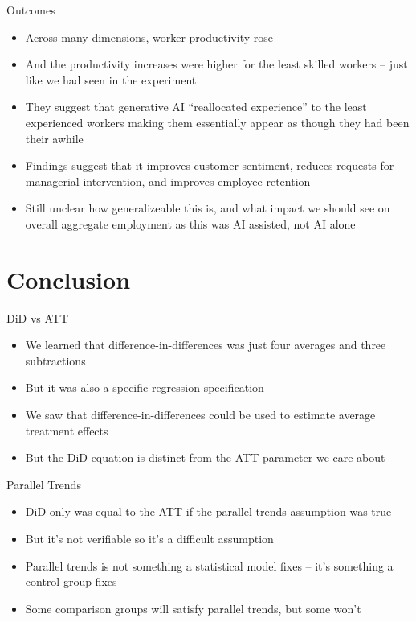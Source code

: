 \documentclass{beamer}
\begin{document}
\begin{frame}{Outcomes}

\begin{itemize}

\item Across many dimensions, worker productivity rose
\item And the productivity increases were higher for the least skilled workers -- just like we had seen in the experiment
\item They suggest that generative AI ``reallocated experience'' to the least experienced workers making them essentially appear as though they had been their awhile
\item Findings suggest that it improves customer sentiment, reduces requests for managerial intervention, and improves employee retention
\item Still unclear how generalizeable this is, and what impact we should see on overall aggregate employment as this was AI assisted, not AI alone

\end{itemize}

\end{frame}


\section{Conclusion}



\begin{frame}{DiD vs ATT}

\begin{itemize}

\item We learned that difference-in-differences was just four averages and three subtractions
\item But it was also a specific regression specification
\item We saw that difference-in-differences could be used to estimate average treatment effects 
\item But the DiD equation is distinct from the ATT parameter we care about

\end{itemize}

\end{frame}


\begin{frame}{Parallel Trends}

\begin{itemize}

\item DiD only was equal to the ATT if the parallel trends assumption was true
\item But it's not verifiable so it's a difficult assumption
\item Parallel trends is not something a statistical model fixes -- it's something a control group fixes
\item Some comparison groups will satisfy parallel trends, but some won't

\end{itemize}

\end{frame}
\end{document}

